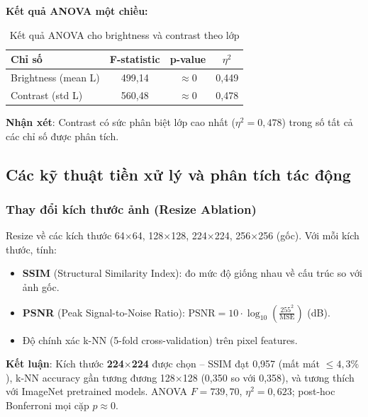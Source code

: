 \documentclass[12pt,a4paper]{article}
\let\oldtextbf\textbf
\renewcommand{\textbf}[1]{\oldtextbf{\textcolor{hcmublue}{#1}}}
\begin{document}
\textbf{Kết quả ANOVA một chiều:}
\begin{table}[H]
\centering
\begin{tabular}{|l|c|c|c|}
\hline
\textbf{Chỉ số} & \textbf{F-statistic} & \textbf{p-value} & \textbf{$\eta^2$} \\ \hline
Brightness (mean L) & 499,14 & $\approx 0$ & 0,449 \\ \hline
Contrast (std L) & 560,48 & $\approx 0$ & 0,478 \\ \hline
\end{tabular}
\caption{Kết quả ANOVA cho brightness và contrast theo lớp}
\label{tab:img_anova_bc}
\end{table}

\textbf{Nhận xét}: Contrast có sức phân biệt lớp cao nhất ($\eta^2 = 0{,}478$) trong số tất cả các chỉ số được phân tích.

\subsection{Các kỹ thuật tiền xử lý và phân tích tác động}

\subsubsection{Thay đổi kích thước ảnh (Resize Ablation)}

Resize về các kích thước 64$\times$64, 128$\times$128, 224$\times$224, 256$\times$256 (gốc). Với mỗi kích thước, tính:
\begin{itemize}
    \item \textbf{SSIM} (Structural Similarity Index): đo mức độ giống nhau về cấu trúc so với ảnh gốc.
    \item \textbf{PSNR} (Peak Signal-to-Noise Ratio): $\text{PSNR} = 10\cdot\log_{10}\!\!\left(\frac{255^2}{\text{MSE}}\right)$ (dB).
    \item Độ chính xác k-NN (5-fold cross-validation) trên pixel features.
\end{itemize}

\textbf{Kết luận}: Kích thước \textbf{224$\times$224} được chọn -- SSIM đạt 0{,}957 (mất mát $\leq 4{,}3\%$), k-NN accuracy gần tương đương 128$\times$128 (0{,}350 so với 0{,}358), và tương thích với ImageNet pretrained models. ANOVA $F=739{,}70$, $\eta^2=0{,}623$; post-hoc Bonferroni mọi cặp $p \approx 0$.
\end{document}
